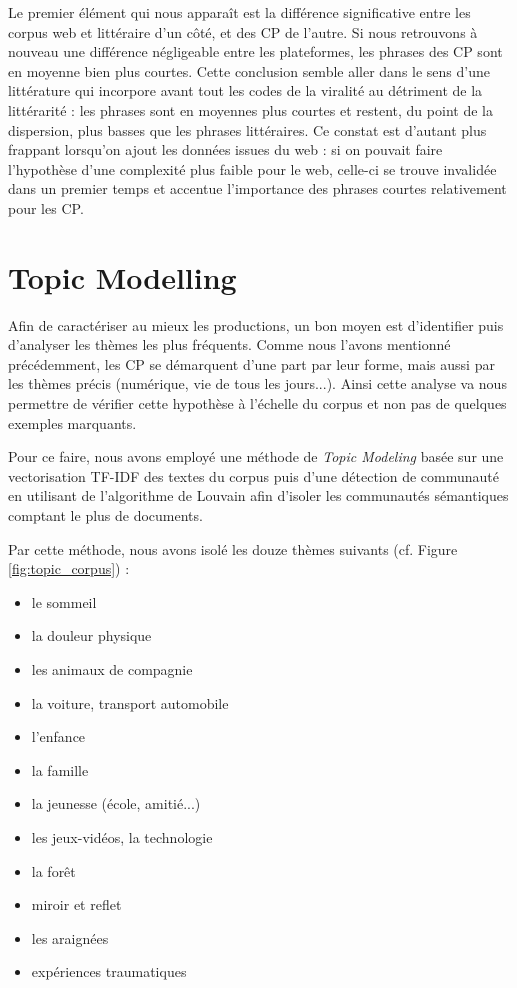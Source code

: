 \documentclass[12pt,a4paper,oneside,titlepage]{book} %
\begin{document}
	Le premier élément qui nous apparaît est la différence significative entre les corpus web et littéraire d'un côté, et des CP de l'autre. Si nous retrouvons à nouveau une différence négligeable entre les plateformes, les phrases des CP sont en moyenne bien plus courtes. 
	Cette conclusion semble aller dans le sens d'une littérature qui incorpore avant tout les codes de la viralité au détriment de la littérarité : les phrases sont en moyennes plus courtes et restent, du point de la dispersion, plus basses que les phrases littéraires. Ce constat est d'autant plus frappant lorsqu'on ajout les données issues du web : si on pouvait faire l'hypothèse d'une complexité plus faible pour le web, celle-ci se trouve invalidée dans un premier temps et accentue l'importance des phrases courtes relativement pour les CP.


	\section{Topic Modelling}
	\label{section_topic}


	
	Afin de caractériser au mieux les productions, un bon moyen est d'identifier puis d'analyser les thèmes les plus fréquents. Comme nous l'avons mentionné précédemment, les CP se démarquent d'une part par leur forme, mais aussi par les thèmes précis (numérique, vie de tous les jours...). Ainsi cette analyse va nous permettre de vérifier cette hypothèse à l'échelle du corpus et non pas de quelques exemples marquants. 

	Pour ce faire, nous avons employé une méthode de \emph{Topic Modeling} basée sur une vectorisation TF-IDF des textes du corpus puis d'une détection de communauté en utilisant de l'algorithme de Louvain afin d'isoler les communautés sémantiques comptant le plus de documents. 

	
	Par cette méthode,  nous avons isolé les douze thèmes suivants (cf. Figure \ref{fig:topic_corpus}) : 
	\begin{itemize}
		\item le sommeil
		\item la douleur physique
		\item les animaux de compagnie
		\item la voiture, transport automobile
		\item l'enfance
		\item la famille
		\item la jeunesse (école, amitié...)
		\item les jeux-vidéos, la technologie
		\item la forêt
		\item miroir et reflet
		\item les araignées
		\item expériences traumatiques\\

		\end{itemize}
\end{document}

